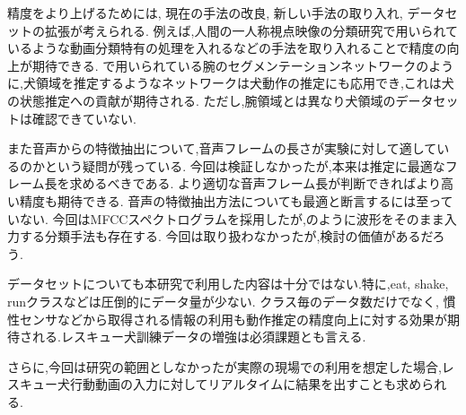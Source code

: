 \documentclass[MIRU,submit]{miru2019j}
\begin{document}
精度をより上げるためには, 現在の手法の改良, 新しい手法の取り入れ, データセットの拡張が考えられる.
例えば,人間の一人称視点映像の分類研究で用いられているような動画分類特有の処理を入れるなどの手法を取り入れることで精度の向上が期待できる.
\cite{minghuang2016fpar}で用いられている腕のセグメンテーションネットワークのように,犬領域を推定するようなネットワークは犬動作の推定にも応用でき,これは犬の状態推定への貢献が期待される.
ただし,腕領域とは異なり犬領域のデータセットは確認できていない.

また音声からの特徴抽出について,音声フレームの長さが実験に対して適しているのかという疑問が残っている.
今回は検証しなかったが,本来は推定に最適なフレーム長を求めるべきである.
より適切な音声フレーム長が判断できればより高い精度も期待できる.
音声の特徴抽出方法についても最適と断言するには至っていない.
今回はMFCCスペクトログラムを採用したが,\cite{aytar2016soundnet}のように波形をそのまま入力する分類手法も存在する.
今回は取り扱わなかったが,検討の価値があるだろう.

データセットについても本研究で利用した内容は十分ではない.特に,eat, shake, runクラスなどは圧倒的にデータ量が少ない.
クラス毎のデータ数だけでなく, 慣性センサなどから取得される情報の利用も動作推定の精度向上に対する効果が期待される.レスキュー犬訓練データの増強は必須課題とも言える.

さらに,今回は研究の範囲としなかったが実際の現場での利用を想定した場合,レスキュー犬行動動画の入力に対してリアルタイムに結果を出すことも求められる.




\end{document}
